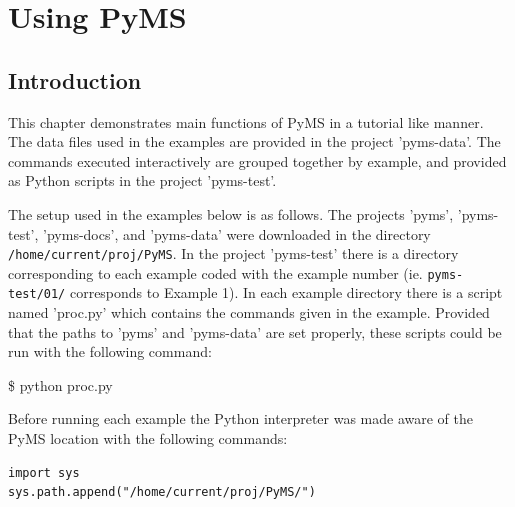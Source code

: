 

\chapter{Using PyMS}

\section{Introduction}

This chapter demonstrates main functions of PyMS in a tutorial like manner.
The data files used in the examples are provided in the project 'pyms-data'.
The commands executed interactively are grouped together by example, and
provided as Python scripts in the project 'pyms-test'.

The setup used in the examples below is as follows. The projects 'pyms',
'pyms-test', 'pyms-docs', and 'pyms-data' were downloaded in the directory
{\tt /home/current/proj/PyMS}. In the project 'pyms-test' there is a directory
corresponding to each example coded with the example number (ie.
{\tt pyms-test/01/} corresponds to Example 1). In each example directory
there is a script named 'proc.py' which contains the commands given in
the example. Provided that the paths to 'pyms' and 'pyms-data' are set
properly, these scripts could be run with the following command:

\$ python proc.py

Before running each example the Python interpreter was made aware of the
PyMS location with the following commands:

\begin{verbatim}
import sys
sys.path.append("/home/current/proj/PyMS/")
\end{verbatim}

